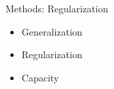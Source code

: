 %

\begin{slide}{Methods: Regularization}
  \begin{itemize}
    \item Generalization
    \item Regularization
    \item Capacity
  \end{itemize}
\end{slide}

